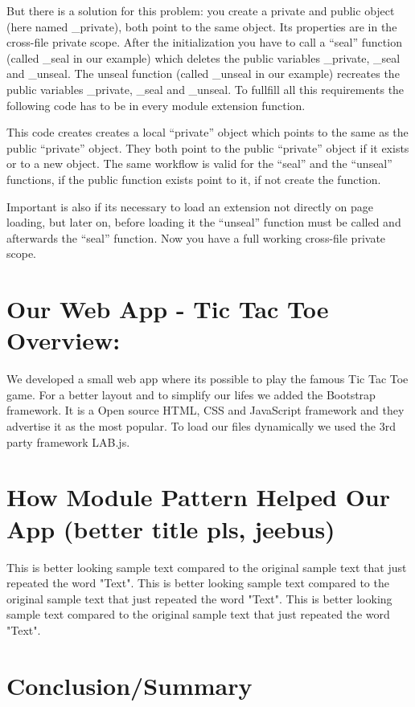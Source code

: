 \documentclass{bioinfo}
\begin{document}
But there is a solution for this problem: you create a private and public object (here named \_private), both point
to the same object. Its properties are in the cross-file private scope. After the initialization
you have to call a ``seal'' function (called \_seal in our example) which deletes the public
variables \_private, \_seal and \_unseal. The unseal function (called \_unseal in our example)
recreates the public variables \_private, \_seal and \_unseal. To fullfill all this
requirements the following code has to be in every module extension function.


This code creates creates a local ``private'' object which points to the same as the public ``private''
object. They both point to the public ``private'' object if it exists or to a new object.
The same workflow is valid for the ``seal'' and the ``unseal'' functions, if the public function
exists point to it, if not create the function.

Important is also if its necessary to load an extension not directly on page loading, but
later on, before loading it the ``unseal'' function must be called and afterwards the
``seal'' function. Now you have a full working cross-file private scope.

\section{Our Web App - Tic Tac Toe Overview:}
We developed a small web app where its possible to play the famous Tic Tac Toe game.
For a better layout and to simplify our lifes we added the Bootstrap framework. It is
a Open source HTML, CSS and JavaScript framework and they advertise it as the most popular.
To load our files dynamically we used the 3rd party framework LAB.js.

\section{How Module Pattern Helped Our App (better title pls, jeebus)}

This is better looking sample text compared to the original sample text that just repeated the word "Text". This is better looking sample text compared to the original sample text that just repeated the word "Text". This is better looking sample text compared to the original sample text that just repeated the word "Text".


\section{Conclusion/Summary}
\end{document}
